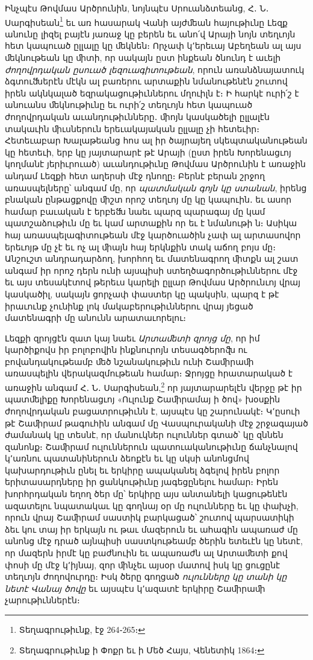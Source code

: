 \documentclass{article}
\begin{document}
{Ինչպէս Թովմաս Արծրունին, նոյնպէս Սրուանձտեանց, Հ․ Ն․ Սարգիսեան\footnote{Տեղագրութիւնք, էջ 264֊265։} եւ առ հասարակ Վանի այժﬔան հայութիւնը Լեզք անունը լիզել բայէն յառաջ կը բերեն եւ անո՛վ Արայի նոյն տեղւոյն հետ կապուած ըլլալը կը ﬔկնեն։ Որչափ կ՚երեւայ Աբեղեան ալ այս ﬔկնութեան կը ﬕտի, որ սակայն ըստ ինքեան ծնունդ է աւելի \emph{ժողովրդական ըսուած լեզուագիտութեան}, որուն առանձնայատուկ ձգտուﬓերէն մէկն ալ բառերու արտաքին նմանութենէն շուտով իրեն ակնկալած եզրակացութիւններու մղուիլն է։ Ի հարկէ ուրի՛շ է անուանս ﬔկնութիւնը եւ ուրի՛շ տեղւոյն հետ կապուած ժողովրդական աւանդութիւնները․ ﬕոյն կասկածելի ըլլալէն տակաւին ﬕւսներուն երեւակայական ըլլալը չի հետեւիր։ Հետեւաբար Խալաթեանց հոս ալ իր ծայրայեղ սկեպտականութեան կը հետեւի, երբ կը յայտարարէ թէ Արայի (ըստ իրեն Խորենացւոյ կողմանէ յերիւրուած) աւանդութիւնը Թովմաս Արծրունին է առաջին անդամ Լեզքի հետ աղերսի մէջ դնողը։ Բերնէ բերան շրջող առասպելները՝ անգամ մը, որ \emph{պատմական գոյն կը ստանան}, իրենց բնական ընթացքովը ﬕշտ որոշ տեղւոյ մը կը կապուին․ եւ ասոր համար բաւական է երբեﬓ նաեւ պարզ պարագայ մը կամ պատշաձութիւն մը եւ կամ արտաքին որ եւ է նմանութի ն։ Ասիկա հայ առասպելագիտութեան մէջ կարծուածին չափ ալ արտասովոր երեւոյթ մը չէ եւ ոչ ալ ﬕայն հայ երկնքին տակ աճող բոյս մը։ Անշուշտ անդրադարձող, խորհող եւ մատենագրող ﬕտքն ալ շատ անգամ իր որոշ դերն ունի այսպիսի ստեղծագործութիւններու մէջ եւ այս տեսակէտով թերեւս կարելի ըլլար Թովմաս Արծրունւոյ վրայ կասկածիլ, սակայն ցորչափ փաստեր կը պակսին, պարզ է թէ իրաւունք չունինք լոկ մակաբերութիւններու վրայ յեցած մատենագրի մը անունն արատաւորելու։

Լեզքի զրոյցէն զատ կայ նաեւ \emph{Արտաﬔտի զրոյց մը}, որ իմ կարծիքովս իր բոլոբովին ինքնուրոյն տեսագծերոﬖ ու բովանդակութեամբ ﬔծ նշանակութիւն ունի Շաﬕրաﬕ առասպելին վերակազմութեան համար։ Ջրոյցը հրատարակած է առաջին անգամ Հ․ Ն․ Սարգիսեան,\footnote{Տեղագրութիւնք ի Փոքր եւ ի Մեծ Հայս, Վենետիկ 1864։} որ յայտարարելէն վերջը թէ իր պատﬔլիքը Խորենացւոյ «Ուլունք Շաﬕրամայ ի ծով» խօսքին ժողովրդական բացատրութիւնն է, այսպէս կը շարունակէ։ Կ՚ըսուի թէ Շաﬕրամ թագուհին անգամ մը Վասպուրականի մէջ շրջագայած ժամանակ կը տեսնէ, որ մանուկներ ուլուններ գտած՝ կը զննեն զանոնք։ Շաﬕրամ ուլուններուն պատուականութիւնը ճանչնալով կ՚առնու պատանիներուն ձեոքէն եւ կը սկսի անոնցմով կախարդութիւն ընել եւ երկիրը ապականել ձգելով իրեն բոլոր երիտասարդները իր ցանկութիւնը յագեցընելու համար։ Իրեն խորհրդական եղող ծեր մը՝ երկիրը այս անտանելի կացութենէն ազատելու նպատակաւ կը գողնայ օր մը ուլունները եւ կը փախչի, որուն վրայ Շաﬕրամ սաստիկ բարկացած՝ շուտով պարսատիկի ձեւ կու տայ իր երկայն ու թաւ մազերուն եւ ահագին ապառաժ մը անոնց մէջ դրած այնպիսի սաստկութեամբ ծերին ետեւէն կը նետէ, որ մազերն իրմէ կը բաժնուին եւ ապառաժն ալ Արտաﬔտի քով փոսի մը մէջ կ՚իյնայ, զոր ﬕնչեւ այսօր մատով իսկ կը ցուցընէ տեղւոյն ժողովուրդը։ Իսկ ծերը գողցած \emph{ուլունները կը տանի կը նետէ Վանայ ծովը} եւ այսպէս կ՚ազատէ երկիրը Շաﬕրաﬕ չարութիւններէն։

}
\end{document}
